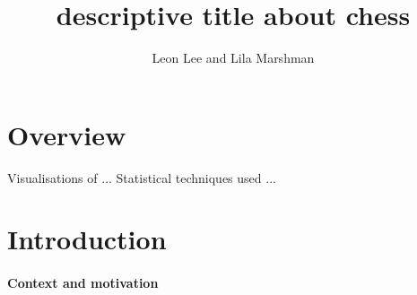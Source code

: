 \documentclass[10pt,a4paper,twocolumn]{article}
\title{descriptive title about chess}
\author{Leon Lee and Lila Marshman}
\begin{document}
\maketitle


\section{Overview}

Visualisations of ...
Statistical techniques used ...

\section{Introduction}

\paragraph{Context and motivation}
\end{document}
